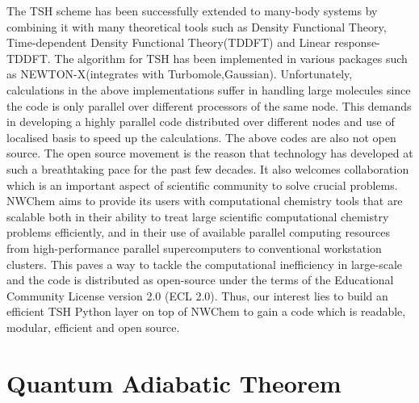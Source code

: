 The TSH scheme has been successfully extended to many-body systems by combining it with many theoretical tools such as Density Functional Theory, Time-dependent Density Functional Theory(TDDFT) and Linear response-TDDFT.\cite{dft_tsh,tddft_tsh,Tavernelli} The algorithm for TSH has been implemented in various packages such as NEWTON-X(integrates with Turbomole,Gaussian).\cite{newton-x} Unfortunately, calculations in the above implementations suffer in handling large molecules since the code is only parallel over different processors of the same node. This demands in developing a highly parallel code distributed over different nodes and use of localised basis to speed up the calculations. The above codes are also not open source. The open source movement is the reason that technology has developed at such a breathtaking pace for the past few decades. It also welcomes collaboration which is an important aspect of scientific community to solve crucial problems. NWChem aims to provide its users with computational chemistry tools that are scalable both in their ability to treat large scientific computational chemistry problems efficiently, and in their use of available parallel computing resources from high-performance parallel supercomputers to conventional workstation clusters.\cite{nwchem} This paves a way to tackle the computational inefficiency in large-scale and the code is distributed as open-source under the terms of the Educational Community License version 2.0 (ECL 2.0). Thus, our interest lies to build an efficient TSH Python layer on top of NWChem to gain a code which is readable, modular, efficient and open source. 

\section{Quantum Adiabatic Theorem}

